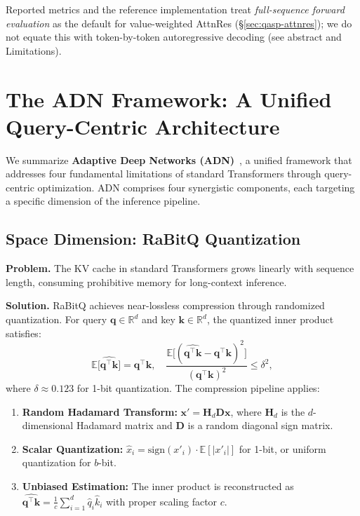 \documentclass[twocolumn]{article}
\begin{document}
\noindent
Reported metrics and the reference implementation treat \emph{full-sequence forward evaluation} as the default for value-weighted AttnRes (\S\ref{sec:qasp-attnres}); we do not equate this with token-by-token autoregressive decoding (see abstract and Limitations).

\section{The ADN Framework: A Unified Query-Centric Architecture}
\label{sec:adn}

We summarize \textbf{Adaptive Deep Networks (ADN)}~\cite{adn}, a unified framework that addresses four fundamental limitations of standard Transformers through query-centric optimization. ADN comprises four synergistic components, each targeting a specific dimension of the inference pipeline.

\subsection{Space Dimension: RaBitQ Quantization}
\label{sec:adn-rabitq}

\textbf{Problem.} The KV cache in standard Transformers grows linearly with sequence length, consuming prohibitive memory for long-context inference.

\textbf{Solution.} RaBitQ \cite{rabitq} achieves near-lossless compression through randomized quantization. For query $\mathbf{q} \in \mathbb{R}^d$ and key $\mathbf{k} \in \mathbb{R}^d$, the quantized inner product satisfies:
\begin{equation}
\mathbb{E}\bigl[\widehat{\mathbf{q}^\top \mathbf{k}}\bigr] = \mathbf{q}^\top \mathbf{k}, \quad \frac{\mathbb{E}\bigl[(\widehat{\mathbf{q}^\top \mathbf{k}} - \mathbf{q}^\top \mathbf{k})^2\bigr]}{(\mathbf{q}^\top \mathbf{k})^2} \leq \delta^2,
\end{equation}
where $\delta \approx 0.123$ for 1-bit quantization. The compression pipeline applies:
\begin{enumerate}[leftmargin=*]
    \item \textbf{Random Hadamard Transform:} $\mathbf{x}' = \mathbf{H}_d \mathbf{D} \mathbf{x}$, where $\mathbf{H}_d$ is the $d$-dimensional Hadamard matrix and $\mathbf{D}$ is a random diagonal sign matrix.
    \item \textbf{Scalar Quantization:} $\hat{x}_i = \mathrm{sign}(x'_i) \cdot \mathbb{E}[|x'_i|]$ for 1-bit, or uniform quantization for $b$-bit.
    \item \textbf{Unbiased Estimation:} The inner product is reconstructed as $\widehat{\mathbf{q}^\top \mathbf{k}} = \frac{1}{c} \sum_{i=1}^{d} \hat{q}_i \hat{k}_i$ with proper scaling factor $c$.
\end{enumerate}
\end{document}
